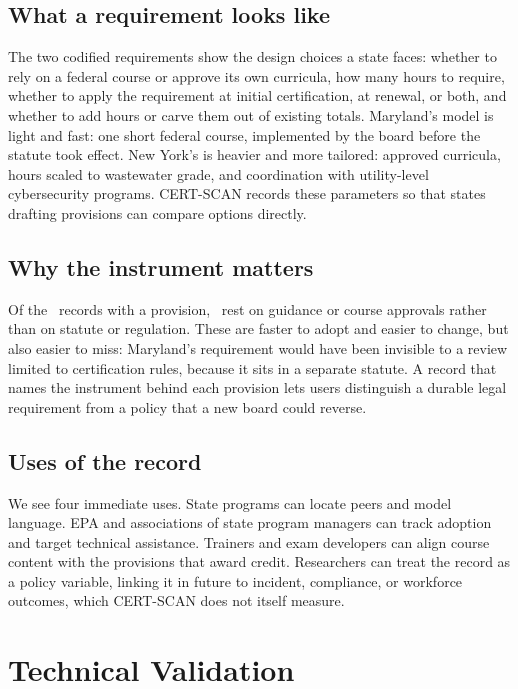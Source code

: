 \documentclass[10pt,twocolumn,letterpaper]{article}
\begin{document}
\subsection{What a requirement looks like}

The two codified requirements show the design choices a state faces: whether to rely on a federal course or approve its own curricula, how many hours to require, whether to apply the requirement at initial certification, at renewal, or both, and whether to add hours or carve them out of existing totals. Maryland's model is light and fast: one short federal course, implemented by the board before the statute took effect. New York's is heavier and more tailored: approved curricula, hours scaled to wastewater grade, and coordination with utility-level cybersecurity programs. CERT-SCAN records these parameters so that states drafting provisions can compare options directly.

\subsection{Why the instrument matters}

Of the \nPositive\ records with a provision, \nNonCodified\ rest on guidance or course approvals rather than on statute or regulation. These are faster to adopt and easier to change, but also easier to miss: Maryland's requirement would have been invisible to a review limited to certification rules, because it sits in a separate statute. A record that names the instrument behind each provision lets users distinguish a durable legal requirement from a policy that a new board could reverse.

\subsection{Uses of the record}

We see four immediate uses. State programs can locate peers and model language. EPA and associations of state program managers can track adoption and target technical assistance. Trainers and exam developers can align course content with the provisions that award credit. Researchers can treat the record as a policy variable, linking it in future to incident, compliance, or workforce outcomes, which CERT-SCAN does not itself measure.

\section{Technical Validation}\label{sec:validation}
\end{document}
